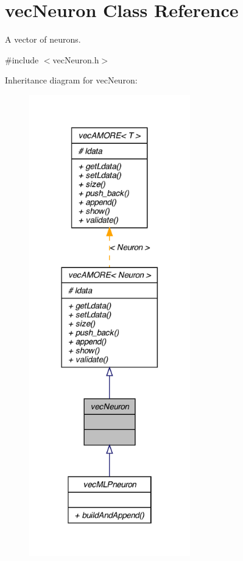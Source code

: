 \hypertarget{classvec_neuron}{
\section{vecNeuron Class Reference}
\label{classvec_neuron}
}


A vector of neurons.  




{\ttfamily \#include $<$vecNeuron.h$>$}



Inheritance diagram for vecNeuron:
\nopagebreak
\begin{figure}[H]
\begin{center}
\leavevmode
\includegraphics[width=198pt]{classvec_neuron__inherit__graph}
\end{center}
\end{figure}


